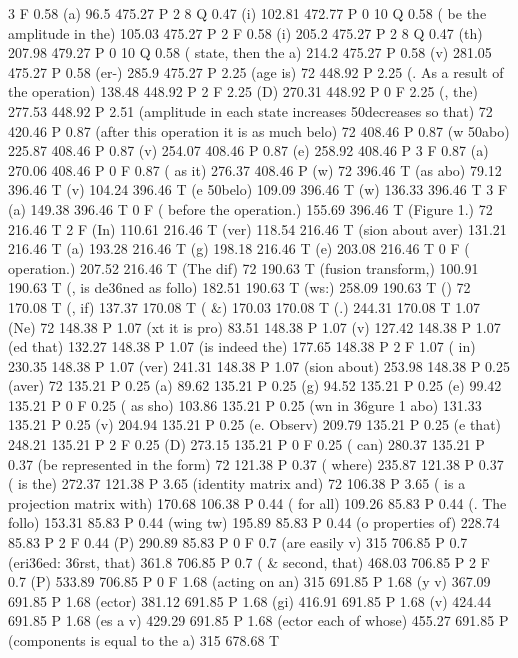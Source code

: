 3 F
0.58 (a) 96.5 475.27 P
2 8 Q
0.47 (i) 102.81 472.77 P
0 10 Q
0.58 ( be the amplitude in the) 105.03 475.27 P
2 F
0.58 (i) 205.2 475.27 P
2 8 Q
0.47 (th) 207.98 479.27 P
0 10 Q
0.58 ( state, then the a) 214.2 475.27 P
0.58 (v) 281.05 475.27 P
0.58 (er-) 285.9 475.27 P
2.25 (age is) 72 448.92 P
2.25 (. As a result of the operation) 138.48 448.92 P
2 F
2.25 (D) 270.31 448.92 P
0 F
2.25 (, the) 277.53 448.92 P
2.51 (amplitude in each state increases \050decreases so that) 72 420.46 P
0.87 (after this operation it is as much belo) 72 408.46 P
0.87 (w \050abo) 225.87 408.46 P
0.87 (v) 254.07 408.46 P
0.87 (e) 258.92 408.46 P
3 F
0.87 (a) 270.06 408.46 P
0 F
0.87 ( as it) 276.37 408.46 P
(w) 72 396.46 T
(as abo) 79.12 396.46 T
(v) 104.24 396.46 T
(e \050belo) 109.09 396.46 T
(w) 136.33 396.46 T
3 F
(a) 149.38 396.46 T
0 F
( before the operation.) 155.69 396.46 T
(Figure 1.) 72 216.46 T
2 F
(In) 110.61 216.46 T
(ver) 118.54 216.46 T
(sion about aver) 131.21 216.46 T
(a) 193.28 216.46 T
(g) 198.18 216.46 T
(e) 203.08 216.46 T
0 F
( operation.) 207.52 216.46 T
(The dif) 72 190.63 T
(fusion transform,) 100.91 190.63 T
(, is de\336ned as follo) 182.51 190.63 T
(ws:) 258.09 190.63 T
() 72 170.08 T
(, if) 137.37 170.08 T
( &) 170.03 170.08 T
(.) 244.31 170.08 T
1.07 (Ne) 72 148.38 P
1.07 (xt it is pro) 83.51 148.38 P
1.07 (v) 127.42 148.38 P
1.07 (ed that) 132.27 148.38 P
1.07 (is indeed the) 177.65 148.38 P
2 F
1.07 ( in) 230.35 148.38 P
1.07 (ver) 241.31 148.38 P
1.07 (sion about) 253.98 148.38 P
0.25 (aver) 72 135.21 P
0.25 (a) 89.62 135.21 P
0.25 (g) 94.52 135.21 P
0.25 (e) 99.42 135.21 P
0 F
0.25 ( as sho) 103.86 135.21 P
0.25 (wn in \336gure 1 abo) 131.33 135.21 P
0.25 (v) 204.94 135.21 P
0.25 (e. Observ) 209.79 135.21 P
0.25 (e that) 248.21 135.21 P
2 F
0.25 (D) 273.15 135.21 P
0 F
0.25 ( can) 280.37 135.21 P
0.37 (be represented in the form) 72 121.38 P
0.37 ( where) 235.87 121.38 P
0.37 ( is the) 272.37 121.38 P
3.65 (identity matrix and) 72 106.38 P
3.65 ( is a projection matrix with) 170.68 106.38 P
0.44 ( for all) 109.26 85.83 P
0.44 (. The follo) 153.31 85.83 P
0.44 (wing tw) 195.89 85.83 P
0.44 (o properties of) 228.74 85.83 P
2 F
0.44 (P) 290.89 85.83 P
0 F
0.7 (are easily v) 315 706.85 P
0.7 (eri\336ed: \336rst, that) 361.8 706.85 P
0.7 ( & second, that) 468.03 706.85 P
2 F
0.7 (P) 533.89 706.85 P
0 F
1.68 (acting on an) 315 691.85 P
1.68 (y v) 367.09 691.85 P
1.68 (ector) 381.12 691.85 P
1.68 (gi) 416.91 691.85 P
1.68 (v) 424.44 691.85 P
1.68 (es a v) 429.29 691.85 P
1.68 (ector each of whose) 455.27 691.85 P
(components is equal to the a) 315 678.68 T
